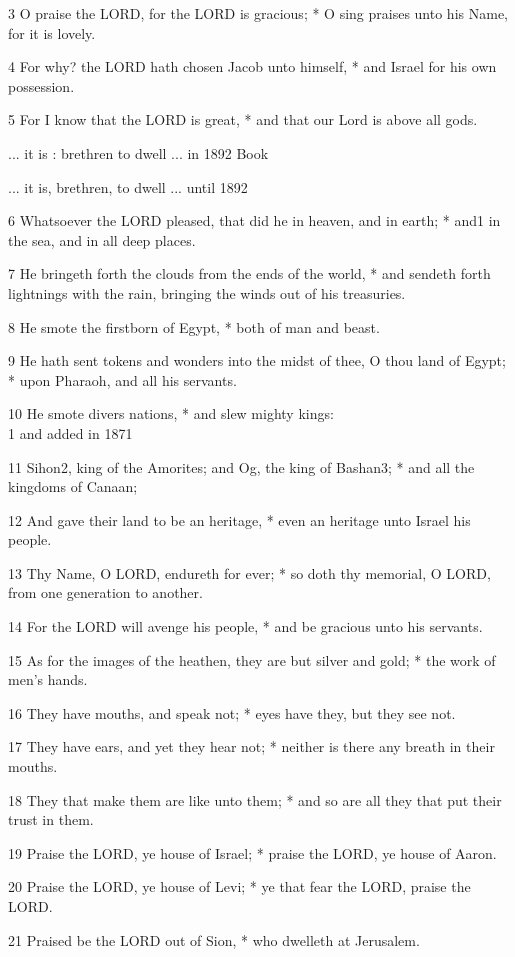 3 O praise the LORD, for the LORD is gracious; * O
sing praises unto his Name, for it is lovely.

4 For why? the LORD hath chosen Jacob unto himself,
* and Israel for his own possession.

5 For I know that the LORD is great, * and that our Lord is above all gods.

... it is : brethren to dwell
... in 1892 Book

... it is, brethren, to dwell ... until
1892

6 Whatsoever the LORD pleased, that did he in heaven,
and in earth; * and1 in the sea, and in all deep places.

7 He bringeth forth the clouds from the ends of the world,
* and sendeth forth lightnings with the rain, bringing the winds out of
his treasuries.

8 He smote the firstborn of Egypt, * both of man and
beast.

9 He hath sent tokens and wonders into the midst of thee,
O thou land of Egypt; * upon Pharaoh, and all his servants.

10 He smote divers nations, * and slew mighty kings: \\
1 and added
in 1871

11 Sihon2, king of the Amorites; and Og, the king of Bashan3;
* and all the kingdoms of Canaan;

12 And gave their land to be an heritage, * even an
heritage unto Israel his people.

13 Thy Name, O LORD, endureth for ever; * so doth thy
memorial, O LORD, from one generation to another.

14 For the LORD will avenge his people, * and be gracious
unto his servants.

15 As for the images of the heathen, they are but silver
and gold; * the work of men's hands.

16 They have mouths, and speak not; * eyes have they,
but they see not.

17 They have ears, and yet they hear not; * neither
is there any breath in their mouths.

18 They that make them are like unto them; * and so
are all they that put their trust in them.

19 Praise the LORD, ye house of Israel; * praise the
LORD, ye house of Aaron.

20 Praise the LORD, ye house of Levi; * ye that fear
the LORD, praise the LORD.

21 Praised be the LORD out of Sion, * who dwelleth
at Jerusalem. 

